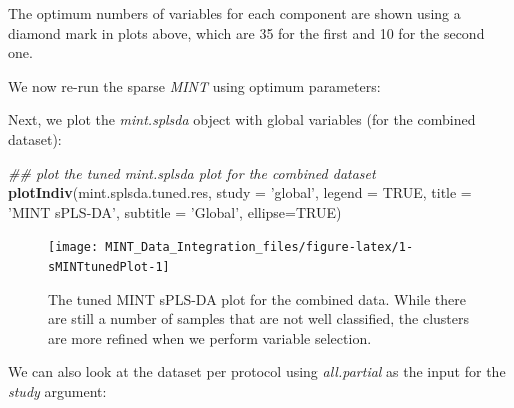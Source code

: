 \documentclass[]{book}
\newenvironment{Shaded}{\begin{snugshade}}{\end{snugshade}}
\newcommand{\CommentTok}[1]{\textcolor[rgb]{0.56,0.35,0.01}{\textit{#1}}}
\newcommand{\DataTypeTok}[1]{\textcolor[rgb]{0.13,0.29,0.53}{#1}}
\newcommand{\DecValTok}[1]{\textcolor[rgb]{0.00,0.00,0.81}{#1}}
\newcommand{\KeywordTok}[1]{\textcolor[rgb]{0.13,0.29,0.53}{\textbf{#1}}}
\newcommand{\NormalTok}[1]{#1}
\newcommand{\OperatorTok}[1]{\textcolor[rgb]{0.81,0.36,0.00}{\textbf{#1}}}
\newcommand{\OtherTok}[1]{\textcolor[rgb]{0.56,0.35,0.01}{#1}}
\newcommand{\StringTok}[1]{\textcolor[rgb]{0.31,0.60,0.02}{#1}}
\theoremstyle{definition}
\theoremstyle{definition}
\theoremstyle{definition}
\theoremstyle{remark}
\begin{document}
The optimum numbers of variables for each component are shown using a
diamond mark in plots above, which are 35 for the first and 10 for the
second one.

We now re-run the sparse \emph{MINT} using optimum parameters:

\begin{Shaded}
\end{Shaded}

Next, we plot the \emph{mint.splsda} object with global variables (for
the combined dataset):

\begin{Shaded}
\begin{Highlighting}[]
\CommentTok{## plot the tuned mint.splsda plot for the combined dataset}
\KeywordTok{plotIndiv}\NormalTok{(mint.splsda.tuned.res, }\DataTypeTok{study =} \StringTok{'global'}\NormalTok{, }\DataTypeTok{legend =} \OtherTok{TRUE}\NormalTok{,}
          \DataTypeTok{title =} \StringTok{'MINT sPLS-DA'}\NormalTok{,  }\DataTypeTok{subtitle =} \StringTok{'Global'}\NormalTok{, }\DataTypeTok{ellipse=}\OtherTok{TRUE}\NormalTok{)}
\end{Highlighting}
\end{Shaded}

\begin{figure}[ht]

{\centering \texttt{[image: MINT\_Data\_Integration\_files/figure-latex/1-sMINTtunedPlot-1]} 

}

\caption{The tuned MINT sPLS-DA plot for the combined data. While there are still a number of samples that are not well classified, the clusters are more refined when we perform variable selection.}\label{fig:1-sMINTtunedPlot}
\end{figure}

We can also look at the dataset per protocol using \emph{all.partial} as
the input for the \emph{study} argument:
\end{document}
